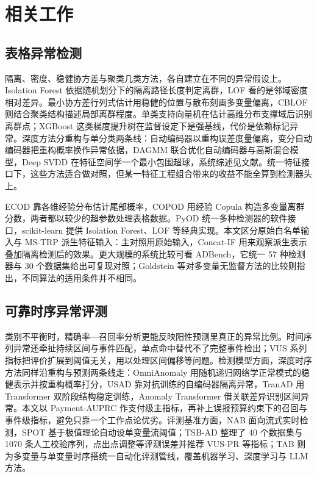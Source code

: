 \documentclass[a4paper,fleqn]{cas-dc}
\begin{document}
\section{相关工作}
\subsection{表格异常检测}
隔离、密度、稳健协方差与聚类几类方法，各自建立在不同的异常假设上。Isolation Forest 依据随机划分下的隔离路径长度判定离群\cite{ref2}，LOF 看的是邻域密度相对差异\cite{ref3}。最小协方差行列式估计用稳健的位置与散布刻画多变量偏离\cite{ref4}，CBLOF 则结合聚类结构描述局部离群程度\cite{ref5}。单类支持向量机在估计高维分布支撑域后识别离群点\cite{ref6}；XGBoost 这类梯度提升树在监督设定下是强基线，代价是依赖标记异常\cite{ref7}。深度方法分重构与单分类两条线：自动编码器以重构误差度量偏离\cite{ref8}，变分自动编码器把重构概率换作异常依据\cite{ref9}，DAGMM 联合优化自动编码器与高斯混合模型\cite{ref10}，Deep SVDD 在特征空间学一个最小包围超球\cite{ref11}，系统综述见文献\cite{ref12}。统一特征接口下，这些方法适合做对照，但某一特征工程组合带来的收益不能全算到检测器头上。

ECOD 靠各维经验分布估计尾部概率\cite{ref13}，COPOD 用经验 Copula 构造多变量离群分数\cite{ref14}，两者都以较少的超参数处理表格数据。PyOD 统一多种检测器的软件接口\cite{ref15}，scikit-learn 提供 Isolation Forest、LOF 等经典实现\cite{ref16}。本文区分原始白名单输入与 MS-TRP 派生特征输入：主对照用原始输入，Concat-IF 用来观察派生表示叠加隔离检测后的效果。更大规模的系统比较可看 ADBench，它统一 57 种检测器与 30 个数据集给出可复现对照\cite{ref17}；Goldstein 等对多变量无监督方法的比较则指出，不同算法的适用条件并不相同\cite{ref18}。

\subsection{可靠时序异常评测}
类别不平衡时，精确率—召回率分析更能反映阳性预测里真正的异常比例\cite{ref19}。时间序列异常还牵扯持续区间与事件匹配，单点命中替代不了完整事件检出；VUS 系列指标把评价扩展到阈值无关，用以处理区间偏移等问题\cite{ref20}。检测模型方面，深度时序方法同样沿重构与预测两条线走：OmniAnomaly 用随机递归网络学正常模式的稳健表示并按重构概率打分\cite{ref21}，USAD 靠对抗训练的自编码器隔离异常\cite{ref22}，TranAD 用 Transformer 双阶段结构稳定训练\cite{ref23}，Anomaly Transformer 借关联差异识别区间异常\cite{ref24}。本文以 Payment-AUPRC 作支付级主指标，再补上误报预算约束下的召回与事件级指标，避免只靠一个工作点论优劣。评测基准方面，NAB 面向流式实时检测\cite{ref25}，SPOT 基于极值理论自动设单变量流阈值\cite{ref26}；TSB-AD 整理了 40 个数据集与 1070 条人工校验序列，点出点调整等评测误差并推荐 VUS-PR 等指标\cite{ref27}；TAB 则为多变量与单变量时序搭统一自动化评测管线，覆盖机器学习、深度学习与 LLM 方法\cite{ref28}。
\end{document}
